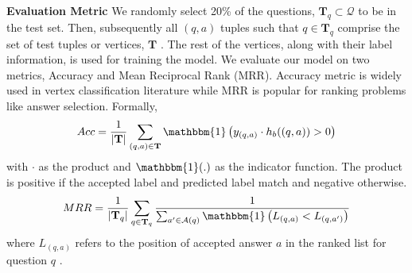 \noindent
\textbf{Evaluation Metric}
We randomly select 20\% of the questions, $\mathbf{T}_q \subset \mathcal{Q}$ to be in the test set. Then, subsequently all $(q,a)$ tuples such that $q \in \mathbf{T}_q$ comprise the set of test tuples or vertices, $\mathbf{T}$ . The rest of the vertices, along with their label information, is used for training the model.
We evaluate our model on two metrics, Accuracy and Mean Reciprocal Rank (MRR). Accuracy metric is widely used in vertex classification literature while MRR is popular for ranking problems like answer selection. Formally,
\begin{align}
Acc = \frac{1}{\vert \mathbf{T} \vert} \sum_{(q,a) \in  \mathbf{T} } \mathbbm{1} \left(  y_{(q,a)} \cdot h_b((q,a)) > 0 \right)
\end{align}
with $\cdot$ as the product and $\mathbbm{1}(.)$ as the indicator function. The product is positive if the accepted label and predicted label match and negative otherwise.
\begin{equation}
MRR = \frac{1}{\vert \mathbf{T}_q \vert} \sum_{q \in \mathbf{T}_q} \frac{1}{\sum_{a' \in \mathcal{A}(q)}  \mathbbm{1} \left(L_{(q,a)} < L_{(q,a')} \right)}
\end{equation}
 where
$L_{(q,a)}$ refers to the position of accepted answer $a$ in the ranked list for question $q$ \cite{Wang:2009}.

